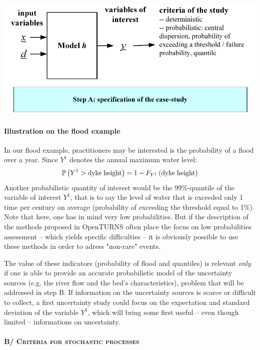 \begin{center}
  \includegraphics[scale=0.8]{Figures/flow2.pdf}
\end{center}

\paragraph{Illustration on the flood example}
\par

In our flood example, practitioners may be interested is the probability of a flood over a year. Since $Y^1$ denotes the annual maximum water level:
\begin{align*}
  {\mathbb P}\left( Y^1 > \textrm{dyke\;height} \right) = 1 - F_{Y^1} \left( \textrm{dyke\;height} \right)
\end{align*}
Another probabilistic quantity of interest would be the 99\%-quantile of the variable of interest $Y^1$, that is to say the level of water that is exceeded only 1 time per century on average (probability of exceeding the threshold equal to 1\%). Note that here, one has in mind very low probabilities. But if the description of the methods proposed in OpenTURNS often place the focus on low probabilities assessment -- which yields specific difficulties -- it is obviously possible to use these methods in order to adress "non-rare" events.

The value of these indicators (probability of flood and quantiles) is relevant {\em only} if one is able to provide an accurate probabilistic model of the uncertainty sources (e.g. the river flow and the bed's characteristics), problem that will be addressed in step B. If information on the uncertainty sources is scarce or difficult to collect, a first uncertainty study could focus on the expectation and standard deviation of the variable $Y^1$, which will bring some first useful -- even though limited -- informations on uncertainty.

\paragraph{\textsc{B/ Criteria for stochastic processes}}
\par

